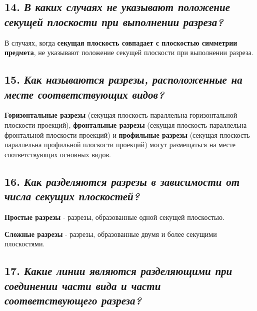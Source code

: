 
\subsection*{14. \textit{В каких случаях не указывают положение секущей плоскости при выполнении разреза?}}

В случаях, когда \textbf{секущая плоскость совпадает с плоскостью симметрии предмета}, не указывают положение секущей плоскости при выполнении разреза.
\subsection*{15. \textit{Как называются разрезы, расположенные на месте соответствующих видов?}}

\textbf{Горизонтальные разрезы} (секущая плоскость параллельна горизонтальной плоскости проекций), \textbf{фронтальные разрезы} (секущая плоскость параллельна фронтальной плоскости проекций) и \textbf{профильные разрезы} (секущая плоскость параллельна профильной плоскости проекций) могут размещаться на месте соответствующих основных видов.
\subsection*{16. \textit{Как разделяются разрезы в зависимости от числа секущих плоскостей?}}

\textbf{Простые разрезы} - разрезы, образованные одной секущей плоскостью.




\textbf{Сложные разрезы} - разрезы, образованные двумя и более секущими плоскостями.



\subsection*{17. \textit{Какие линии являются разделяющими при соединении части вида и части соответствующего разреза?}}

